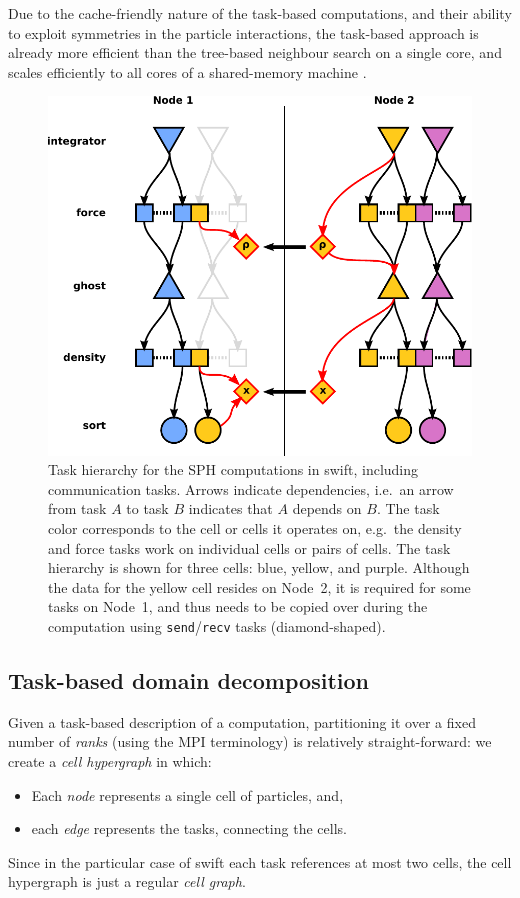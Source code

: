 \documentclass{sig-alternate-05-2015}
\newcommand{\swift}{{\sc swift}\xspace}
\begin{document}
Due to the cache-friendly nature of the task-based computations, 
and their ability to exploit symmetries in the particle interactions,
the task-based approach is already more efficient than the tree-based
neighbour search on a single core, and scales efficiently to all
cores of a shared-memory machine \cite{gonnet2015efficient}.

\begin{figure}
\centering
\includegraphics[width=\columnwidth]{Figures/Hierarchy3}
\caption{Task hierarchy for the SPH computations in \swift,
  including communication tasks.
  Arrows indicate dependencies,
  i.e.~an arrow from task $A$ to task $B$ indicates that $A$
  depends on $B$. 
  The task color corresponds to the cell or
  cells it operates on, e.g.~the density and force tasks work
  on individual cells or pairs of cells.
  The task hierarchy is shown for three cells: blue, yellow,
  and purple. Although the data for the yellow cell resides on
  Node~2, it is required for some tasks on Node~1, and thus needs
  to be copied over  during
  the computation using {\tt send}/{\tt recv} tasks (diamond-shaped).}
\label{tasks}
\end{figure}  


\subsection{Task-based domain decomposition}

Given a task-based description of a computation, partitioning it over
a fixed number of {\em ranks} (using the MPI terminology)
is relatively straight-forward: we create
a {\em cell hypergraph} in which:
\begin{itemize}
  \item Each {\em node} represents a single cell of particles, and,
  \item each {\em edge} represents the tasks, connecting the
    cells.
\end{itemize}
Since in the particular case of \swift each task references at most
two cells, the cell hypergraph is just a regular {\em cell graph}.
\end{document}
